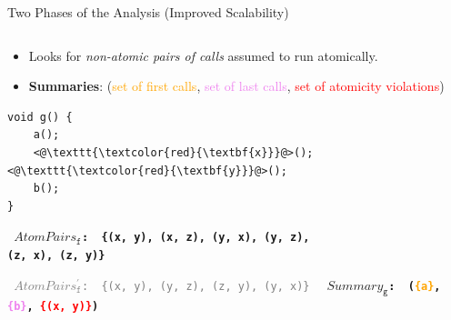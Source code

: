 \documentclass[%
    10pt, xcolor=pdflatex, hyperref={unicode}, aspectratio=169%
]{beamer}
\begin{document}
\begin{frame}[fragile]{Two Phases of the Analysis (Improved Scalability)}
\begin{columns}
\begin{column}[T]{.45 \linewidth}
            \begin{itemize}
                \item
                    Looks for \emph{non-atomic pairs of calls}
                    assumed to \alert{run atomically}.

                \item
                    \textbf{Summaries}: (\textcolor{orange}{set of
                    first calls}, \textcolor{violet}{set of last
                    calls}, \textcolor{red}{set of atomicity
                    violations})
            \end{itemize}

\begin{lstlisting}
void g() {
    a();
    <@\texttt{\textcolor{red}{\textbf{x}}}@>(); <@\texttt{\textcolor{red}{\textbf{y}}}@>();
    b();
}
\end{lstlisting}

            \textbf{\texttt{\scriptsize
                $ AtomPairs_\mathtt{f} $:\,%
                \{(x,~y), (x,~z), (y,~x), (y,~z), \\ \hspace{6em}
                (z,~x), (z,~y)\}
            }}
            
            \textcolor{gray}{\texttt{\scriptsize
                $ AtomPairs_\mathtt{f}^\prime $:\,%
                \{(x,~y), (y,~z), (z,~y), (y,~x)\}
            }}
            \textbf{\texttt{\footnotesize
                \alert{$ Summary_\mathtt{g} $}:\,%
                (\textcolor{orange}{\{a\}},
                \textcolor{violet}{\{b\}},
                \textcolor{red}{\{(x,~y)\}})
            }}
        \end{column}
    \end{columns}
\end{frame}


\end{document}
